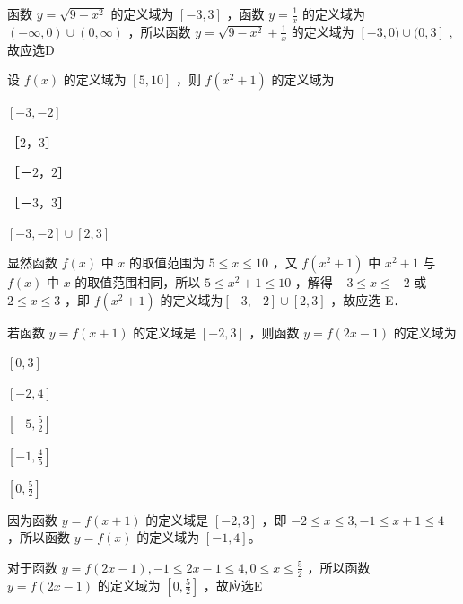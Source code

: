 \begin{solution}
 函数 $y=\sqrt{9-x^2}$ 的定义域为 $[-3,3]$ ，函数 $y=\frac{1}{x}$ 的定义域为 $(-\infty, 0) \cup(0, \infty)$ ，所以函数 $y=\sqrt{9-x^2}+\frac{1}{x}$ 的定义域为 $[-3,0) \cup(0,3]$ ,故应选D	
\end{solution}

\begin{example}

设 $f(x)$ 的定义域为 $[5,10]$ ，则 $f\left(x^2+1\right)$ 的定义域为 
  \fillparen[ ]
	\begin{choices}[columns=5]
		\item $[-3,-2]$
		\item $［2，3］$
		\item $［－2，2］$
		\item $［－3，3 ］$
		\item $[-3,-2] \cup[2,3]$	
	\end{choices}
	\vspace{3cm} 
\end{example}
\begin{solution}
显然函数 $f(x)$ 中 $x$ 的取值范围为 $5 \leqslant x \leqslant 10$ ，又 $f\left(x^2+1\right)$ 中 $x^2+1$ 与 $f(x)$ 中 $x$ 的取值范围相同，所以 $5 \leqslant x^2+1 \leqslant 10$ ，解得 $-3 \leqslant x \leqslant-2$ 或 $2 \leqslant x \leqslant 3$ ，即 $f\left(x^2+1\right)$ 的定义域为$[-3,-2] \cup[2,3]$ ，故应选 E．
\end{solution}


\begin{example}
	
若函数 $y=f(x+1)$ 的定义域是 $[-2,3]$ ，则函数 $y=f(2 x-1)$ 的定义域为
	\fillparen[ ]
	\begin{choices}[columns=5]
		\item $[0,3]$
		\item $[-2,4]$
		\item $\left[-5, \frac{5}{2}\right]$
		\item $\left[-1, \frac{4}{5}\right]$
		\item $\left[0, \frac{5}{2}\right]$
	\end{choices}
\end{example}
\begin{solution}
因为函数 $y=f(x+1)$ 的定义域是 $[-2,3]$ ，即 $-2 \leqslant x \leqslant 3,-1 \leqslant x+1 \leqslant 4$ ，所以函数 $y=f(x)$ 的定义域为 $[-1,4]$。

	
对于函数 $y=f(2 x-1),-1 \leqslant 2 x-1 \leqslant 4,0 \leqslant x \leqslant \frac{5}{2}$ ，所以函数 $y=f(2 x-1)$ 的定义域为 $\left[0, \frac{5}{2}\right]$ ，故应选E
\end{solution}

